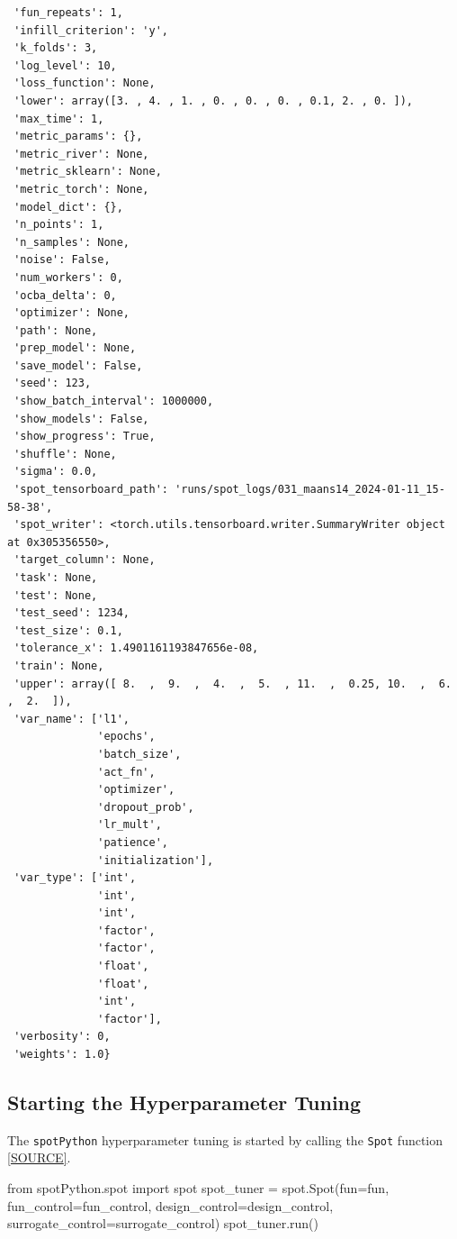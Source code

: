 \documentclass[
  letterpaper,
  DIV=11,
  numbers=noendperiod]{scrreprt}
\newenvironment{Shaded}{\begin{snugshade}}{\end{snugshade}}
\newcommand{\ImportTok}[1]{\textcolor[rgb]{0.00,0.46,0.62}{#1}}
\newcommand{\NormalTok}[1]{\textcolor[rgb]{0.00,0.23,0.31}{#1}}
\newcommand{\OperatorTok}[1]{\textcolor[rgb]{0.37,0.37,0.37}{#1}}
\begin{document}
\begin{verbatim}
 'fun_repeats': 1,
 'infill_criterion': 'y',
 'k_folds': 3,
 'log_level': 10,
 'loss_function': None,
 'lower': array([3. , 4. , 1. , 0. , 0. , 0. , 0.1, 2. , 0. ]),
 'max_time': 1,
 'metric_params': {},
 'metric_river': None,
 'metric_sklearn': None,
 'metric_torch': None,
 'model_dict': {},
 'n_points': 1,
 'n_samples': None,
 'noise': False,
 'num_workers': 0,
 'ocba_delta': 0,
 'optimizer': None,
 'path': None,
 'prep_model': None,
 'save_model': False,
 'seed': 123,
 'show_batch_interval': 1000000,
 'show_models': False,
 'show_progress': True,
 'shuffle': None,
 'sigma': 0.0,
 'spot_tensorboard_path': 'runs/spot_logs/031_maans14_2024-01-11_15-58-38',
 'spot_writer': <torch.utils.tensorboard.writer.SummaryWriter object at 0x305356550>,
 'target_column': None,
 'task': None,
 'test': None,
 'test_seed': 1234,
 'test_size': 0.1,
 'tolerance_x': 1.4901161193847656e-08,
 'train': None,
 'upper': array([ 8.  ,  9.  ,  4.  ,  5.  , 11.  ,  0.25, 10.  ,  6.  ,  2.  ]),
 'var_name': ['l1',
              'epochs',
              'batch_size',
              'act_fn',
              'optimizer',
              'dropout_prob',
              'lr_mult',
              'patience',
              'initialization'],
 'var_type': ['int',
              'int',
              'int',
              'factor',
              'factor',
              'float',
              'float',
              'int',
              'factor'],
 'verbosity': 0,
 'weights': 1.0}
\end{verbatim}

\subsection{Starting the Hyperparameter
Tuning}\label{sec-call-the-hyperparameter-tuner-31}

The \texttt{spotPython} hyperparameter tuning is started by calling the
\texttt{Spot} function
\href{https://github.com/sequential-parameter-optimization/spotPython/blob/main/src/spotPython/spot/spot.py}{{[}SOURCE{]}}.

\begin{Shaded}
\begin{Highlighting}[]
\ImportTok{from}\NormalTok{ spotPython.spot }\ImportTok{import}\NormalTok{ spot}
\NormalTok{spot\_tuner }\OperatorTok{=}\NormalTok{ spot.Spot(fun}\OperatorTok{=}\NormalTok{fun,}
\NormalTok{                       fun\_control}\OperatorTok{=}\NormalTok{fun\_control,}
\NormalTok{                       design\_control}\OperatorTok{=}\NormalTok{design\_control,}
\NormalTok{                       surrogate\_control}\OperatorTok{=}\NormalTok{surrogate\_control)}
\NormalTok{spot\_tuner.run()}
\end{Highlighting}
\end{Shaded}
\end{document}
